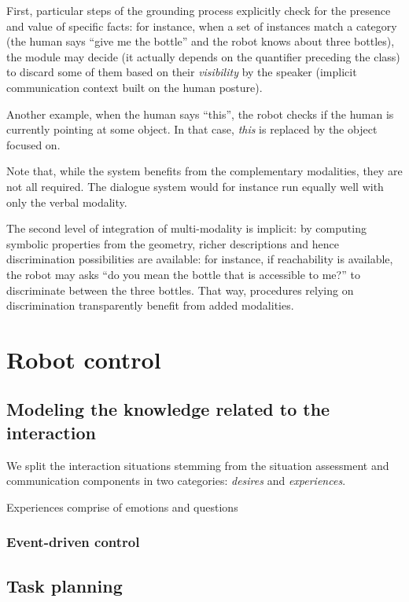 \documentclass[letterpaper, 10 pt, conference]{ieeeconf}  %
\begin{document}
First, particular steps of the grounding process explicitly check for the
presence and value of specific facts: for instance, when a set of instances
match a category (the human says ``give me the bottle'' and the robot knows
about three bottles), the module may decide (it actually depends on the
quantifier preceding the class) to discard some of them based on their
\emph{visibility} by the speaker (implicit communication context built on the
human posture).

Another example, when the human says ``this'', the robot checks if the human is
currently pointing at some object. In that case, \emph{this} is replaced by the
object focused on.

Note that, while the system benefits from the complementary modalities, they
are not all required. The dialogue system would for instance run equally well
with only the verbal modality.

The second level of integration of multi-modality is implicit: by computing
symbolic properties from the geometry, richer descriptions and hence
discrimination possibilities are available: for instance, if reachability is
available, the robot may asks ``do you mean the bottle that is accessible to
me?'' to discriminate between the three bottles. That way, procedures relying
on discrimination transparently benefit from added modalities.

\section{Robot control}
\label{sect|ctrl}

\subsection{Modeling the knowledge related to the interaction}

We split the interaction situations stemming from the situation assessment and
communication components in two categories: \emph{desires} and
\emph{experiences}.

Experiences comprise of emotions and questions

\subsubsection{Event-driven control}

\subsection{Task planning}
\end{document}
